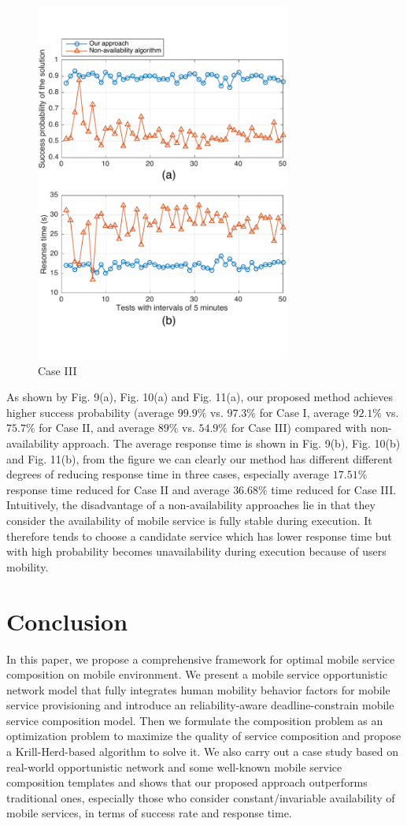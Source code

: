 \documentclass[journal]{IEEEtran}
\begin{document}
\begin{figure}[!t]
\centering
\includegraphics[width=3.3in]{./img/Task-24.pdf}
\caption{Case III}
\label{Task-24}
\end{figure}

As shown by Fig. 9(a), Fig. 10(a) and Fig. 11(a), our proposed method achieves higher success probability (average $99.9\%$ vs. $97.3\%$ for Case I, average $92.1\%$ vs. $75.7\%$ for Case II, and average $89\%$ vs. $54.9\%$ for Case III) compared with non-availability approach.
The average response time is shown in Fig. 9(b), Fig. 10(b) and Fig. 11(b), from the figure we can clearly our method has different different degrees of reducing response time in three cases, especially average $17.51\%$ response time reduced for Case II and average $36.68\%$ time reduced for Case III. Intuitively, the disadvantage of a non-availability approaches lie in that they consider the availability of mobile service is fully stable during execution. It therefore tends to choose a candidate service which has lower response time but with high probability becomes unavailability during execution because of users mobility.

\section{Conclusion}
In this paper, we propose a comprehensive framework for optimal mobile service composition on mobile environment. We present a mobile service opportunistic network model that fully integrates human mobility behavior factors for mobile service provisioning and introduce an reliability-aware deadline-constrain mobile service composition model. Then we formulate the composition problem as an optimization problem to maximize the quality of service composition and propose a Krill-Herd-based algorithm to solve it. We also carry out a case study based on real-world opportunistic network and some well-known mobile service composition templates and shows that our proposed approach outperforms traditional ones, especially those who consider constant/invariable availability of mobile services, in terms of success rate and response time.
\end{document}
